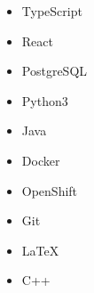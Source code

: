

\begin{multicols}{5}
	\begin{itemize}
		\item TypeScript
		\item React
		\item PostgreSQL
		\item Python3
		\item Java
		\item Docker
		\item OpenShift
		\item Git
		\item LaTeX
		\item C++
	\end{itemize}
\end{multicols}
